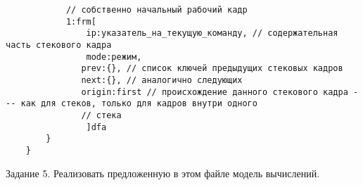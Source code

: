 \documentclass{report}
\begin{document}
\begin{verbatim}
            // собственно начальный рабочий кадр
            1:frm[
                ip:указатель_на_текущую_команду, // содержательная часть стекового кадра
                mode:режим,
               prev:{}, // список ключей предыдущих стековых кадров
               next:{}, // аналогично следующих
               origin:first // происхождение данного стекового кадра --- как для стеков, только для кадров внутри одного
               // стека
                ]dfa
        }
    }
    \end{verbatim}

    Задание 5. Реализовать предложенную в этом файле модель вычислений.
\end{document}
